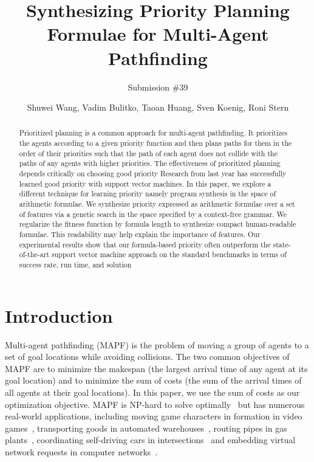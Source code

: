 \documentclass[letterpaper]{article} %
\title{Synthesizing Priority Planning Formulae for Multi-Agent Pathfinding}
\author{
Submission \#39
}
\author{
Shuwei Wang, Vadim Bulitko, Taoan Huang, Sven Koenig, Roni Stern
}
\begin{document}
\maketitle

\begin{abstract}

Prioritized planning is a common approach for multi-agent pathfinding. It prioritizes the agents according to a given priority function and then plans paths for them in the order of their priorities such that the path of each agent does not collide with the paths of any agents with higher priorities. The effectiveness of prioritized planning depends critically on choosing good priority  Research from last year has successfully learned good priority with support vector machines. In this paper, we explore a different technique for learning priority  namely program synthesis in the space of arithmetic formulae. We synthesize priority expressed as arithmetic formulae over a set of features via a genetic search in the space specified by a context-free grammar. We regularize the fitness function by formula length to synthesize compact human-readable formulae. This readability may help explain the importance of features. Our experimental results show that our formula-based priority often outperform the state-of-the-art support vector machine approach on the standard benchmarks in terms of success rate, run time, and solution 

\end{abstract}

\section{Introduction}
\label{sec:introduction}

Multi-agent pathfinding (MAPF) is the problem of moving a group of agents to a set of goal locations while avoiding collisions. The two common objectives of MAPF are to minimize the makespan (the largest arrival time of any agent at its goal location) and to minimize the sum of costs (the sum of the arrival times of all agents at their goal locations). In this paper, we use the sum of costs as our optimization objective. MAPF is NP-hard to solve optimally~\citep{yu213structure, surynek21optimization, ma21multi} but has numerous real-world applications, including moving game characters in formation in video games~\citep{ma217feasibility}, transporting goods in automated warehouses~\cite{wurman28coordinating}, routing pipes in gas plants~\cite{Koen2r}, coordinating self-driving cars in intersections~\cite{Koen23e} and embedding virtual network requests in computer networks~\cite{Koen23g}.
\end{document}
